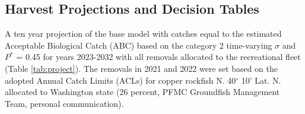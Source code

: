 \documentclass[11pt,
  english,
  a4paper,
]{article}
\begin{document}
\leavevmode\tagmcend\tagstructend\par


\hypertarget{harvest-projections-and-decision-tables}{%
\subsection{Harvest Projections and Decision Tables}\label{harvest-projections-and-decision-tables}}

\leavevmode\tagmcend\tagstructend


A ten year projection of the base model with catches equal to the estimated Acceptable Biological Catch (ABC) based on the category 2 time-varying {\(\sigma\)\leavevmode\tagmcend\tagstructend} and {\(P^*\)\leavevmode\tagmcend\tagstructend} = 0.45 for years 2023-2032 with all removals allocated to the recreational fleet (Table \ref{tab:project}). The removals in 2021 and 2022 were set based on the adopted Annual Catch Limits (ACLs) for copper rockfish N. 40{\(^\circ\)\leavevmode\tagmcend\tagstructend} 10' Lat. N. allocated to Washington state (26 percent, PFMC Groundfish Management Team, personal communication).

\leavevmode\tagmcend\tagstructend\par

\end{document}
